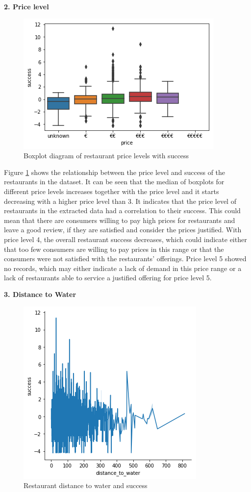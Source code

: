 \documentclass[a4paper, 11pt, oneside]{Thesis}  %
\begin{document}
\textbf{2.	Price level}

\begin{figure}[h]
\includegraphics[scale=0.7]{Figures/Exploratory/boxplot_price_levels.png}
\centering
\caption{Boxplot diagram of restaurant price levels with success}
\label{fig:boxplot_price_levels}
\end{figure}

Figure \ref{fig:boxplot_price_levels} shows the relationship between the price level and success of the restaurants in the dataset. It can be seen that the median of boxplots for different price levels increases together with the price level and it starts decreasing with a higher price level than 3. It indicates that the price level of restaurants in the extracted data had a correlation to their success. This could mean that there are consumers willing to pay high prices for restaurants and leave a good review, if they are satisfied and consider the prices justified. With price level 4, the overall restaurant success decreases, which could indicate either that too few consumers are willing to pay prices in this range or that the consumers were not satisfied with the restaurants’ offerings. Price level 5 showed no records, which may either indicate a lack of demand in this price range or a lack of restaurants able to service a justified offering for price level 5.

\textbf{3.	Distance to Water}
 
\begin{figure}[h]
\includegraphics[scale=0.7]{Figures/Exploratory/lineplot_distance_to_water.png}
\centering
\caption{Restaurant distance to water and success}
\label{fig:lineplot_distance_to_water}
\end{figure}
 
\end{document}
